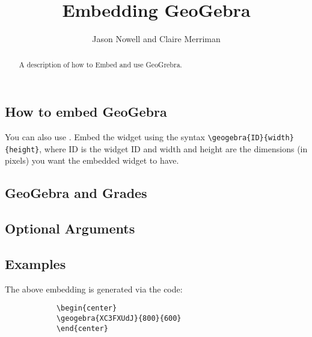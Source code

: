 \documentclass{ximera}
\title{Embedding GeoGebra}
\author{Jason Nowell and Claire Merriman}
\begin{document}
\begin{abstract}
    A description of how to Embed and use GeoGrebra.
\end{abstract}
\maketitle


    \subsection*{How to embed GeoGebra}

        You can also use . Embed the
        widget using the syntax \verb|\geogebra{ID}{width}{height}|, where ID
        is the widget ID and width and height are the dimensions (in pixels)
        you want the embedded widget to have.
        
        
    \subsection*{GeoGebra and Grades}
        
        

    \subsection*{Optional Arguments}
    
        

    \subsection*{Examples}
    
        \begin{center}
        \end{center}
        
        The above embedding is generated via the code:
        
        \begin{verbatim}
            \begin{center}
            \geogebra{XC3FXUdJ}{800}{600}
            \end{center}
        \end{verbatim}      
    
\end{document}
